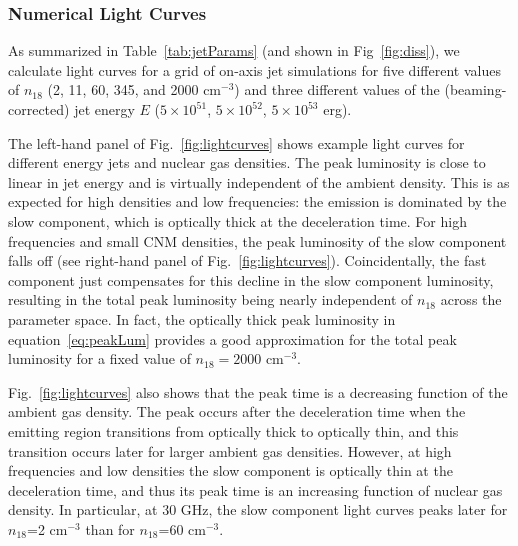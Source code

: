 \documentclass[usenatbib,fleqn]{mnras}
\begin{document}
\subsubsection{Numerical Light Curves}
\label{sec:numResults}
As summarized in Table~\ref{tab:jetParams} (and shown in
Fig~\ref{fig:diss}), we calculate light curves for a grid of on-axis
jet simulations for five different values of $n_{18}$ (2, 11, 60, 345,
and 2000 cm$^{-3}$) and three different values of the
(beaming-corrected) jet energy $E$ ($5\times 10^{51}$, $5\times
10^{52}$, $5\times 10^{53}$ erg).

The left-hand panel of Fig.~\ref{fig:lightcurves} shows example light
curves for different energy jets and nuclear gas densities. The peak
luminosity is close to linear in jet energy and is virtually
independent of the ambient density.  This is as expected for high
densities and low frequencies: the emission is dominated by the slow
component, which is optically thick at the deceleration time.  For
high frequencies and small CNM densities, the peak luminosity of the
slow component falls off (see right-hand panel of
Fig.~\ref{fig:lightcurves}). Coincidentally, the fast component just
compensates for this decline in the slow component luminosity,
resulting in the total peak luminosity being nearly independent of
$n_{18}$ across the parameter space. In fact, the optically thick peak
luminosity in equation~\ref{eq:peakLum} provides a good approximation
for the total peak luminosity for a fixed value of $n_{18}=2000$
cm$^{-3}$.

Fig.~\ref{fig:lightcurves} also shows that the peak time is a
decreasing function of the ambient gas density. The peak occurs after
the deceleration time when the emitting region transitions from
optically thick to optically thin, and this transition occurs later
for larger ambient gas densities. However, at high frequencies and low
densities the slow component is optically thin at the deceleration
time, and thus its peak time is an increasing function of nuclear gas
density. In particular, at 30 GHz, the slow component light curves
peaks later for $n_{18}$=2 cm$^{-3}$ than for $n_{18}$=60 cm$^{-3}$.
\end{document}
